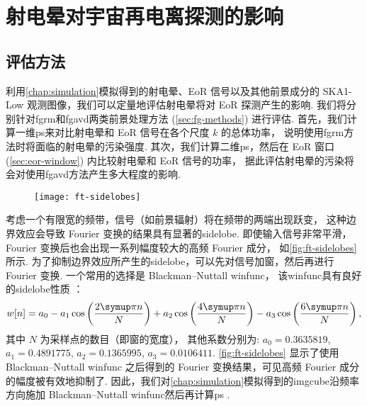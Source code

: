 
\chapter{射电晕对宇宙再电离探测的影响}
\label{chap:halo}

\section{评估方法}

利用\autoref{chap:simulation}模拟得到的射电晕、EoR 信号以及其他前景成分的
SKA1-Low 观测图像，我们可以定量地评估射电晕将对 EoR 探测产生的影响.
我们将分别针对\ac{fgrm}和\ac{fgavd}两类前景处理方法 (\autoref{sec:fg-methods})
进行评估.
首先，我们计算一维\ac{ps}来对比射电晕和 EoR 信号在各个尺度 $k$ 的总体功率，
说明使用\ac{fgrm}方法时将面临的射电晕的污染强度.
其次，我们计算二维\ac{ps}，然后在 EoR 窗口 (\autoref{sec:eor-window})
内比较射电晕和 EoR 信号的功率，
据此评估射电晕的污染将会对使用\ac{fgavd}方法产生多大程度的影响.

\begin{figure}[htp]
  \centering
  \texttt{[image: ft-sidelobes]}
  \label{fig:ft-sidelobes}
\end{figure}

考虑一个有限宽的频带，信号（如前景辐射）将在频带的两端出现跃变，
这种边界效应会导致 Fourier 变换的结果具有显著的\ac{sidelobe}.
即使输入信号非常平滑，Fourier 变换后也会出现一系列幅度较大的高频 Fourier 成分，
如\autoref{fig:ft-sidelobes} 所示.
为了抑制边界效应所产生的\ac{sidelobe}，可以先对信号加窗，然后再进行 Fourier 变换.
一个常用的选择是 Blackman--Nuttall \ac{winfunc}，
该\ac{winfunc}具有良好的\ac{sidelobe}性质 \cite{nuttall1981}：
\begin{equation}
  w[n] = a_0 - a_1 \cos\left(\frac{2\Cpi n}{N}\right)
    + a_2 \cos\left(\frac{4\Cpi n}{N}\right)
    - a_3 \cos\left(\frac{6\Cpi n}{N}\right) ,
\end{equation}
其中
$N$ 为采样点的数目（即窗的宽度），
其他系数分别为:
$a_0 = \num{0.3635819}$,
$a_1 = \num{0.4891775}$,
$a_2 = \num{0.1365995}$,
$a_3 = \num{0.0106411}$.
\autoref{fig:ft-sidelobes} 显示了使用 Blackman--Nuttall \ac{winfunc}
之后得到的 Fourier 变换结果，可见高频 Fourier 成分的幅度被有效地抑制了.
因此，我们对\autoref{chap:simulation}模拟得到的\ac{imgcube}沿频率方向施加
Blackman--Nuttall \ac{winfunc}然后再计算\ac{ps}
\cite{trott2015,chapman2016}.


